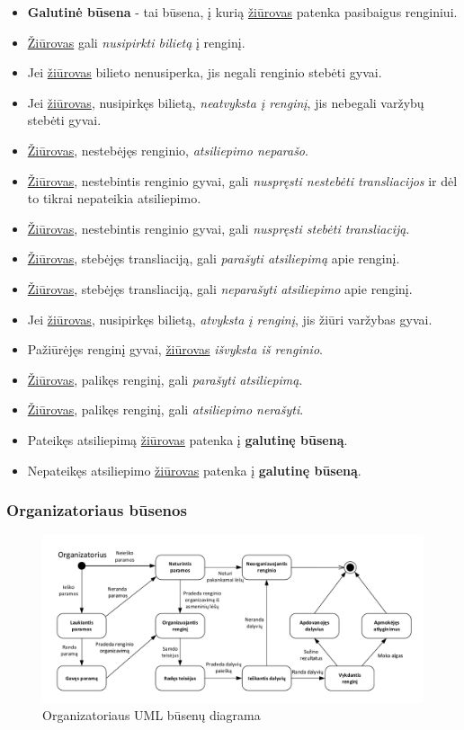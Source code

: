 \documentclass{VUMIFPSkursinis}
\begin{document}
      \begin{itemize}
        \item \textbf{Galutinė būsena} - tai būsena, į kurią \underline{žiūrovas} patenka pasibaigus renginiui.
        \item \underline{Žiūrovas} gali \textit{nusipirkti bilietą} į renginį.
        \item Jei \underline{žiūrovas} bilieto nenusiperka, jis negali renginio stebėti gyvai.
        \item Jei \underline{žiūrovas}, nusipirkęs bilietą, \textit{neatvyksta į renginį}, jis nebegali varžybų stebėti gyvai.
        \item \underline{Žiūrovas}, nestebėjęs renginio, \textit{atsiliepimo neparašo}.
        \item \underline{Žiūrovas}, nestebintis renginio gyvai, gali \textit{nuspręsti nestebėti transliacijos} ir dėl to tikrai nepateikia atsiliepimo.
        \item \underline{Žiūrovas}, nestebintis renginio gyvai, gali \textit{nuspręsti stebėti transliaciją}.
        \item \underline{Žiūrovas}, stebėjęs transliaciją, gali \textit{parašyti atsiliepimą} apie renginį.
        \item \underline{Žiūrovas}, stebėjęs transliaciją, gali \textit{neparašyti atsiliepimo} apie renginį.
        \item Jei \underline{žiūrovas}, nusipirkęs bilietą, \textit{atvyksta į renginį}, jis žiūri varžybas gyvai.
        \item Pažiūrėjęs renginį gyvai, \underline{žiūrovas} \textit{išvyksta iš renginio}.
        \item \underline{Žiūrovas}, palikęs renginį, gali \textit{parašyti atsiliepimą}.
        \item \underline{Žiūrovas}, palikęs renginį, gali \textit{atsiliepimo nerašyti}.
        \item Pateikęs atsiliepimą \underline{žiūrovas} patenka į \textbf{galutinę būseną}.
        \item Nepateikęs atsiliepimo \underline{žiūrovas} patenka į \textbf{galutinę būseną}.
      \end{itemize}
	\subsubsection*{Organizatoriaus būsenos}
	  \begin{figure}[H]
      \centering
      \includegraphics[width=\textwidth]{img/BusenuDiagrama3}
      \caption{Organizatoriaus UML būsenų diagrama}
      \label{fig:organizatoriausBusenuDiagrama}
    \end{figure}
\end{document}
